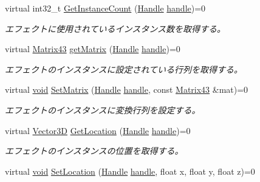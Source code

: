 \begin{DoxyCompactItemize}
virtual int32\+\_\+t \mbox{\hyperlink{class_effekseer_1_1_manager_a4e4831b6514c683cd9cabf5cfe1103ab}{Get\+Instance\+Count}} (\mbox{\hyperlink{namespace_effekseer_afba58b8d812da862190e9bbfc040824a}{Handle}} \mbox{\hyperlink{namespace_effekseer_afd99b336b206999bdcca3e431648efbc}{handle}})=0
\begin{DoxyCompactList}\small\item\em エフェクトに使用されているインスタンス数を取得する。 \end{DoxyCompactList}\item 
virtual \mbox{\hyperlink{struct_effekseer_1_1_matrix43}{Matrix43}} \mbox{\hyperlink{class_effekseer_1_1_manager_abd550c1abf3f8b324ba9a5f71a735ff8}{get\+Matrix}} (\mbox{\hyperlink{namespace_effekseer_afba58b8d812da862190e9bbfc040824a}{Handle}} \mbox{\hyperlink{namespace_effekseer_afd99b336b206999bdcca3e431648efbc}{handle}})=0
\begin{DoxyCompactList}\small\item\em エフェクトのインスタンスに設定されている行列を取得する。 \end{DoxyCompactList}\item 
virtual \mbox{\hyperlink{namespace_effekseer_ab34c4088e512200cf4c2716f168deb56}{void}} \mbox{\hyperlink{class_effekseer_1_1_manager_a69d0768ed69c30d3993ececa6159c4dd}{Set\+Matrix}} (\mbox{\hyperlink{namespace_effekseer_afba58b8d812da862190e9bbfc040824a}{Handle}} \mbox{\hyperlink{namespace_effekseer_afd99b336b206999bdcca3e431648efbc}{handle}}, const \mbox{\hyperlink{struct_effekseer_1_1_matrix43}{Matrix43}} \&mat)=0
\begin{DoxyCompactList}\small\item\em エフェクトのインスタンスに変換行列を設定する。 \end{DoxyCompactList}\item 
virtual \mbox{\hyperlink{struct_effekseer_1_1_vector3_d}{Vector3D}} \mbox{\hyperlink{class_effekseer_1_1_manager_adef5e990faa38e39b9aa57f03f485747}{Get\+Location}} (\mbox{\hyperlink{namespace_effekseer_afba58b8d812da862190e9bbfc040824a}{Handle}} \mbox{\hyperlink{namespace_effekseer_afd99b336b206999bdcca3e431648efbc}{handle}})=0
\begin{DoxyCompactList}\small\item\em エフェクトのインスタンスの位置を取得する。 \end{DoxyCompactList}\item 
virtual \mbox{\hyperlink{namespace_effekseer_ab34c4088e512200cf4c2716f168deb56}{void}} \mbox{\hyperlink{class_effekseer_1_1_manager_aa35fc7968dadeb82e58bb0c472dfb8b1}{Set\+Location}} (\mbox{\hyperlink{namespace_effekseer_afba58b8d812da862190e9bbfc040824a}{Handle}} \mbox{\hyperlink{namespace_effekseer_afd99b336b206999bdcca3e431648efbc}{handle}}, float x, float y, float z)=0

\end{DoxyCompactItemize}
